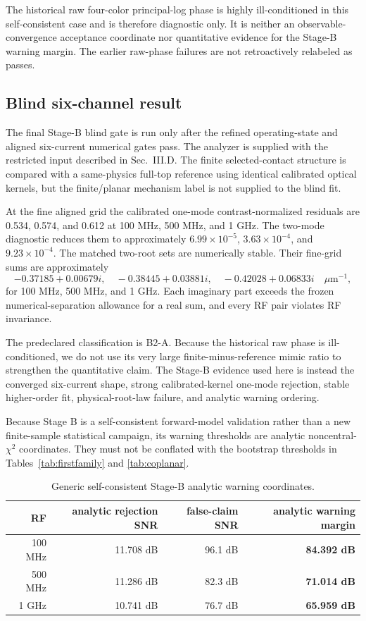 \documentclass[11pt]{article}
\begin{document}
The historical raw four-color principal-log phase is highly ill-conditioned in this self-consistent case and is therefore diagnostic only. It is neither an observable-convergence acceptance coordinate nor quantitative evidence for the Stage-B warning margin. The earlier raw-phase failures are not retroactively relabeled as passes.

\subsection{Blind six-channel result}

The final Stage-B blind gate is run only after the refined operating-state and aligned six-current numerical gates pass. The analyzer is supplied with the restricted input described in Sec.~III.D. The finite selected-contact structure is compared with a same-physics full-top reference using identical calibrated optical kernels, but the finite/planar mechanism label is not supplied to the blind fit.

At the fine aligned grid the calibrated one-mode contrast-normalized residuals are 0.534, 0.574, and 0.612 at 100 MHz, 500 MHz, and 1 GHz. The two-mode diagnostic reduces them to approximately $6.99\times10^{-5}$, $3.63\times10^{-4}$, and $9.23\times10^{-4}$. The matched two-root sets are numerically stable. Their fine-grid sums are approximately
\begin{equation}
-0.37185+0.00679i,\quad
-0.38445+0.03881i,\quad
-0.42028+0.06833i\quad \mu\mathrm m^{-1},
\end{equation}
for 100 MHz, 500 MHz, and 1 GHz. Each imaginary part exceeds the frozen numerical-separation allowance for a real sum, and every RF pair violates RF invariance.

The predeclared classification is B2-A. Because the historical raw phase is ill-conditioned, we do not use its very large finite-minus-reference mimic ratio to strengthen the quantitative claim. The Stage-B evidence used here is instead the converged six-current shape, strong calibrated-kernel one-mode rejection, stable higher-order fit, physical-root-law failure, and analytic warning ordering.

Because Stage B is a self-consistent forward-model validation rather than a new finite-sample statistical campaign, its warning thresholds are analytic noncentral-$\chi^2$ coordinates. They must not be conflated with the bootstrap thresholds in Tables~\ref{tab:firstfamily} and \ref{tab:coplanar}.

\begin{table}[H]
\centering
\caption{Generic self-consistent Stage-B analytic warning coordinates.}
\label{tab:stagebsnr}
\begin{tabular}{rrrr}
\toprule
RF & analytic rejection SNR & false-claim SNR & analytic warning margin\\
\midrule
100 MHz & 11.708 dB & 96.1 dB & \textbf{84.392 dB}\\
500 MHz & 11.286 dB & 82.3 dB & \textbf{71.014 dB}\\
1 GHz & 10.741 dB & 76.7 dB & \textbf{65.959 dB}\\
\bottomrule
\end{tabular}
\end{table}
\end{document}
